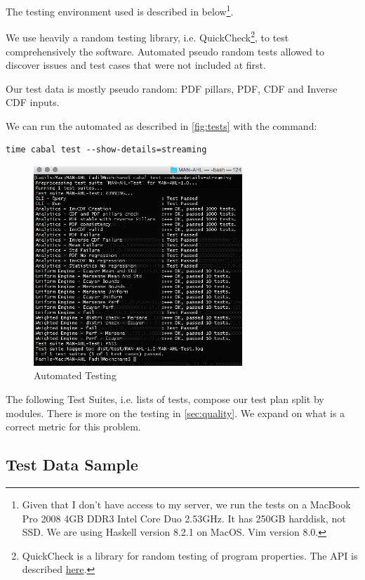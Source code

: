 \documentclass[12pt,a4paper,article]{memoir} %
\begin{document}
The testing environment used is described in below\footnote{
Given that I don't have access to my server, 
we run the tests on a MacBook Pro 2008 4GB DDR3 Intel Core Duo 2.53GHz.
It has 250GB harddisk, not SSD. 
We are using Haskell version 8.2.1 on MacOS. Vim version 8.0.
}.

We use heavily a random testing library, i.e. QuickCheck\footnote{
QuickCheck is a library for random testing of program properties.
The API is described 
\href{http://hackage.haskell.org/package/QuickCheck-2.10.0.1/docs/Test-QuickCheck.html}{here}.
}, to test comprehensively the software.
Automated pseudo random tests allowed to discover issues and
test cases that were not included at first.

Our test data is mostly pseudo random: 
PDF pillars, PDF, CDF and Inverse CDF inputs.

We can run the automated as described in  \autoref{fig:tests} with the command:
\begin{verbatim}
time cabal test --show-details=streaming
\end{verbatim}
\begin{figure}[h!]
\begin{center}
\includegraphics[width=0.7\textwidth]{img/tests.png}
\caption{Automated Testing}
\label{fig:tests}
\end{center}
\end{figure}

The following Test Suites, i.e. lists of tests, compose our test plan split by modules.
There is more on the testing in \autoref{sec:quality}. We expand on what is a correct 
metric for this problem.

\subsection{Test Data Sample}
\end{document}

